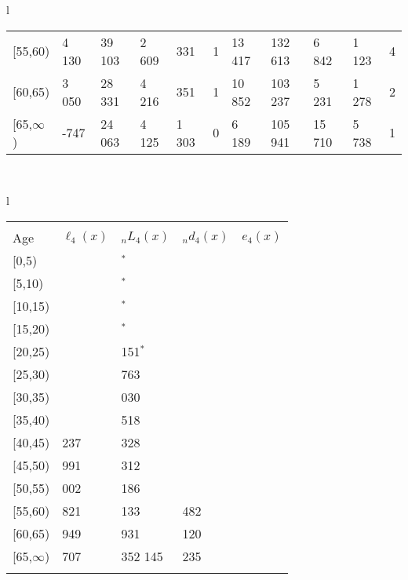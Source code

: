 \documentclass[
]{article}
\begin{document}
\begin{table}
\begin{tabular}[t]{l}
\begin{tabular}
{}[55,60) & 4 130 & 39 103 & 2 609 & 331 & 1 & 13 417 & 132 613 & 6 842 & 1 123 & 4\\
{}[60,65) & 3 050 & 28 331 & 4 216 & 351 & 1 & 10 852 & 103 237 & 5 231 & 1 278 & 2\\
{}[65,$\infty$) & -747 & 24 063 & 4 125 & 1 303 & 0 & 6 189 & 105 941 & 15 710 & 5 738 & 1\\
\end{tabular}\\
\end{tabular}
\centering
\begin{tabular}[t]{l}
\hline
\begin{tabular}{>{\raggedright\arraybackslash}p{.43in}>{\raggedleft\arraybackslash}p{1.3in}>{\raggedleft\arraybackslash}p{1.3in}>{\raggedleft\arraybackslash}p{1.3in}>{\raggedleft\arraybackslash}p{1.3in}}
\toprule
\multicolumn{1}{c}{ } & \multicolumn{4}{c}{(4) Lost both} \\
\cmidrule(l{3pt}r{3pt}){2-5}
Age & $\ell_{4}(x)$ & ${}_nL_{4}(x)$ & ${}_nd_{4}(x)$ & $e_{4}(x)$\\
\midrule
{}[0,5) & 0 & 0$^{*}$ & 0 & 20\\
{}[5,10) & 0 & 705$^{*}$ & 0 & 20\\
{}[10,15) & 126 & 311$^{*}$ & 0 & 20\\
{}[15,20) & 225 & 692$^{*}$ & 0 & 20\\
{}[20,25) & 224 & 1 151$^{*}$ & 1 & 20\\
\addlinespace
{}[25,30) & 223 & 1 763 & 2 & 20\\
{}[30,35) & 456 & 8 030 & 14 & 20\\
{}[35,40) & 765 & 11 518 & 25 & 20\\
{}[40,45) & 2 237 & 21 328 & 59 & 20\\
{}[45,50) & 3 991 & 48 312 & 185 & 20\\
\addlinespace
{}[50,55) & 9 002 & 103 186 & 579 & 20\\
{}[55,60) & 17 821 & 175 133 & 1 482 & 20\\
{}[60,65) & 25 949 & 251 931 & 3 120 & 19\\
{}[65,$\infty$) & 32 707 & 1 352 145 & 73 235 & 17\\
\bottomrule
\multicolumn{5}{l}{\rule{0pt}{1em}\textsuperscript{*} Based on an estimated from SIPP with less than 10 respondents in the numerator.}\\
\end{tabular}\\
\end{tabular}
\end{table}
\end{document}
